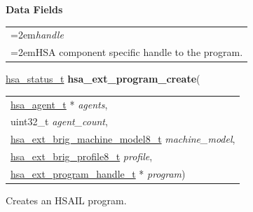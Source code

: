 \documentclass[final]{book}
\newcommand{\hsaarg}[1]{\textit{#1}}
\newcommand{\reffld}[1]{\textit{#1}}
\begin{document}
\noindent\textbf{Data Fields}\\[-6mm]
\begin{longtable}{@{}>{\hangindent=2em}p{\textwidth}}
\reffld{handle}\\\hspace{2em}HSA component specific handle to the program.
\end{longtable}



\noindent\begin{tcolorbox}[breakable,nobeforeafter,colframe=white,colback=lightgray,left=0mm]
\hyperlink{group__status_1gad755322e7ff95456520e8abdbe90d225}{hsa_status_t} \hypertarget{group__HsailLinkerServiceLayer_1gad67b0ec80bc0e9a18336a68cf741b6e8}{\textbf{hsa_ext_program_create}}(
\vspace{-3.5mm}\begin{longtable}{@{}p{\textwidth}}
\hspace{1.7em}\hyperlink{group__topology_1gab8db3fb886332a24acac08ec361e1d86}{hsa_agent_t} * \hsaarg{agents},\\
\hspace{1.7em}uint32_t \hsaarg{agent_count},\\
\hspace{1.7em}\hyperlink{group__FinalizerCoreApi_1ga5030b76e1c72556f42a7dc7eebab16df}{hsa_ext_brig_machine_model8_t} \hsaarg{machine_model},\\
\hspace{1.7em}\hyperlink{group__FinalizerCoreApi_1ga4d058e43da41c147915dbe70cace9947}{hsa_ext_brig_profile8_t} \hsaarg{profile},\\
\hspace{1.7em}\hyperlink{group__HsailLinkerServiceLayer_1gaea8d90863414407ddba7e318db7412f9}{hsa_ext_program_handle_t} * \hsaarg{program})\end{longtable}

\end{tcolorbox}
Creates an HSAIL program.
\end{document}
